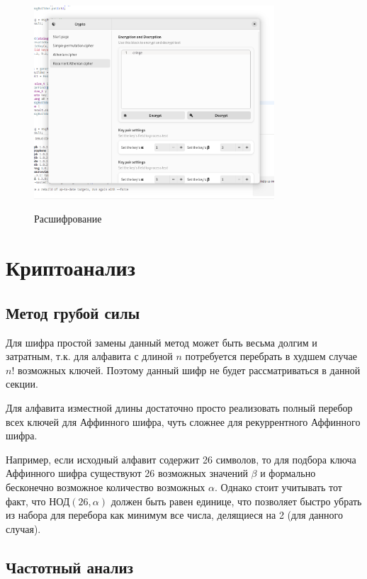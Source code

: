 \documentclass[a4paper]{article}
\begin{document}
  \begin{figure}[H]  
    \centering
    \caption{Расшифрование}
    \includegraphics[width=0.8\textwidth]{01_0011}
    \label{img:0011}
  \end{figure}

  \newpage
  \section{Криптоанализ}

  \subsection{Метод грубой силы}

  Для шифра простой замены данный метод может быть весьма долгим и затратным, т.к. для алфавита 
  с длиной $n$ потребуется перебрать в худшем случае $n!$ возможных ключей. Поэтому данный шифр 
  не будет рассматриваться в данной секции.

  Для алфавита изместной длины достаточно просто реализовать полный перебор всех ключей для 
  Аффинного шифра, чуть сложнее для рекуррентного Аффинного шифра.

  Например, если исходный алфавит содержит 26 символов, то для подбора ключа Аффинного шифра 
  существуют 26 возможных значений $\beta$ и формально бесконечно возможное количество возможных 
  $\alpha$. Однако стоит учитывать тот факт, что НОД$(26, \alpha)$ должен быть равен единице,
  что позволяет быстро убрать из набора для перебора как минимум все числа, делящиеся на 2
  (для данного случая).
  
  \subsection{Частотный анализ}
  
\end{document}
